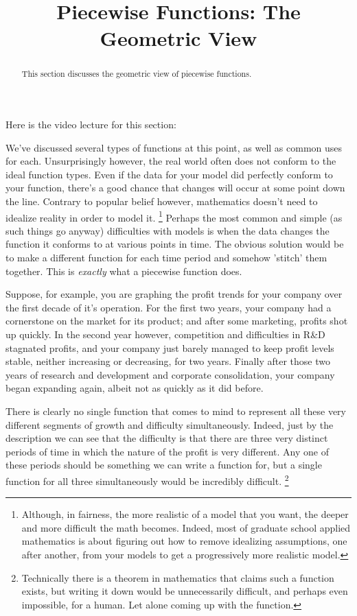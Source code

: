 \documentclass{ximera}
\title{Piecewise Functions: The Geometric View}
\begin{document}
\begin{abstract}
    This section discusses the geometric view of piecewise functions.
\end{abstract}
\maketitle

Here is the video lecture for this section:


We've discussed several types of functions at this point, as well as common uses for each. Unsurprisingly however, the real world often does not conform to the ideal function types. Even if the data for your model did perfectly conform to your function, there's a good chance that changes will occur at some point down the line. Contrary to popular belief however, mathematics doesn't need to idealize reality in order to model it.%
\footnote{Although, in fairness, the more realistic of a model that you want, the deeper and more difficult the math becomes. Indeed, most of graduate school applied mathematics is about figuring out how to remove idealizing assumptions, one after another, from your models to get a progressively more realistic model.}
Perhaps the most common and simple (as such things go anyway) difficulties with models is when the data changes the function it conforms to at various points in time. The obvious solution would be to make a different function for each time period and somehow 'stitch' them together. This is \textit{exactly} what a piecewise function does.


Suppose, for example, you are graphing the profit trends for your company over the first decade of it's operation. For the first two years, your company had a cornerstone on the market for its product; and after some marketing, profits shot up quickly. In the second year however, competition and difficulties in R\&D stagnated profits, and your company just barely managed to keep profit levels stable, neither increasing or decreasing, for two years. Finally after those two years of research and development and corporate consolidation, your company began expanding again, albeit not as quickly as it did before.

There is clearly no single function that comes to mind to represent all these very different segments of growth and difficulty simultaneously. Indeed, just by the description we can see that the difficulty is that there are three very distinct periods of time in which the nature of the profit is very different. Any one of these periods should be something we can write a function for, but a single function for all three simultaneously would be incredibly difficult.%
\footnote{Technically there is a theorem in mathematics that claims such a function exists, but writing it down would be unnecessarily difficult, and perhaps even impossible, for a human. Let alone coming up with the function.}
\end{document}
